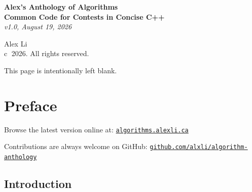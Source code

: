 \documentclass[10pt,letterpaper,twoside]{book}
\begin{document}
 

\providecommand{\BookVersion}{v1.0}
\providecommand{\BookDate}{August 19, 2026}
 
\frontmatter
{}

\begin{titlepage}
	\centering

	\vspace*{6 cm}

	\textbf{\LARGE Alex's Anthology of Algorithms}
	\\[1.0\baselineskip]
	\textbf{\Large Common Code for Contests in Concise C++}
	\\[1.0\baselineskip]
	{\large\textit{\BookVersion, \BookDate}}

	\vspace*{11 cm}

	{\Large Alex Li}
	\\[0.5\baselineskip]
	{\small \textcircled{c} 2026. All rights reserved.}
\end{titlepage}

\clearpage
\thispagestyle{empty}
\vspace*{8 cm}
\centering

{\large This page is intentionally left blank.}

\vspace{\fill}
\clearpage
\makeatletter

\let\cleardoublepage\clearpage
{}
\chapter{Preface}

\raggedright
\setlength{\parskip}{0.5em}

Browse the latest version online at: 
\href{https://algorithms.alexli.ca}{\texttt{algorithms.alexli.ca}}

Contributions are always welcome on GitHub: 
\href{https://github.com/alxli/algorithm-anthology}{\texttt{github.com/alxli/algorithm-anthology}}

\section*{Introduction}
\end{document}
